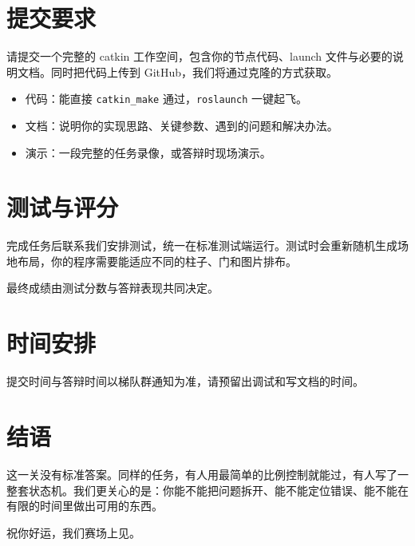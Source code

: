 \documentclass[11pt]{ctexart}
\begin{document}
\section{提交要求}

请提交一个完整的 catkin 工作空间，包含你的节点代码、launch 文件与必要的说明文档。同时把代码上传到 GitHub，我们将通过克隆的方式获取。

\begin{itemize}
\item 代码：能直接 \texttt{catkin\_make} 通过，\texttt{roslaunch} 一键起飞。
\item 文档：说明你的实现思路、关键参数、遇到的问题和解决办法。
\item 演示：一段完整的任务录像，或答辩时现场演示。
\end{itemize}

\section{测试与评分}

完成任务后联系我们安排测试，统一在标准测试端运行。测试时会重新随机生成场地布局，你的程序需要能适应不同的柱子、门和图片排布。

最终成绩由测试分数与答辩表现共同决定。

\section{时间安排}

提交时间与答辩时间以梯队群通知为准，请预留出调试和写文档的时间。

\section{结语}

这一关没有标准答案。同样的任务，有人用最简单的比例控制就能过，有人写了一整套状态机。我们更关心的是：你能不能把问题拆开、能不能定位错误、能不能在有限的时间里做出可用的东西。

祝你好运，我们赛场上见。
\end{document}
